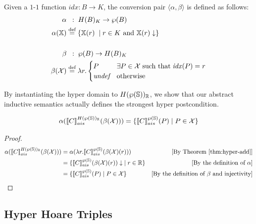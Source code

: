\documentclass[
  10pt,       %
  twoside,    %
  a4paper,    %
  english,    %
  tikz,       %
  openright,  %
]{book}
\begin{document}
\begin{definition}\label{def:cp}
  Given a $1$-$1$ function $\mathit{idx} : B \to K$, the conversion pair $\langle \alpha,\beta\rangle$ is defined
  as follows:
%
  \begin{align*}
    \alpha &\;\;:\; H(B)_K \to \pow{B} \\
    \alpha(\chi) &\defeq \{ \chi(r) \; \mid r \in K \mand \chi(r)\downarrow \} \\
    \\
    \beta &\;\;:\; \pow{B} \to H(B)_K \\
    \beta(\mathcal{X}) &\defeq \lambda r . \begin{cases}
      P              & \exists P \in \mathcal{X} \; \text{such that} \; \mathit{idx}(P) = r \\
      \textit{undef} & \text{otherwise}
    \end{cases}
  \end{align*}
\end{definition}

By instantiating the hyper domain to $H(\pow{\states})_{\mathbb{R}}$, we
show that our abstract inductive semantics actually defines  the strongest hyper
postcondition.

\begin{theorem}
  \label{thm:hyperpost} 
  $$\alpha(\asem[H(\pow{\states})_\mathbb{R}]{C}(\beta(\mathcal{X}))) = \{ \asem[\pow{\states}]{C}(P) \mid P \in \mathcal{X} \}$$
\end{theorem}
\begin{proof}
  \begin{align*}
    \alpha(\asem[H(\pow{\states})_\mathbb{R}]{C}(\beta(\mathcal{X})))
      &= \alpha(\lambda r . \asem[\pow{\states}]{C}(\beta(\mathcal{X})(r)))
      &\text{[By Theorem \ref{thm:hyper-add}]} \\
      &= \{ \asem[\pow{\states}]{C}(\beta(\mathcal{X})(r))\downarrow \;
        \mid r \in \mathbb{R} \}
      &\text{[By the definition of $\alpha$]}\\
      &= \{ \asem[\pow{\states}]{C}(P) \mid P \in \mathcal{X} \}
      &\text{[By the definition of $\beta$ and injectivity]}
  \end{align*}
\end{proof}

\subsection{Hyper Hoare Triples}
\end{document}
